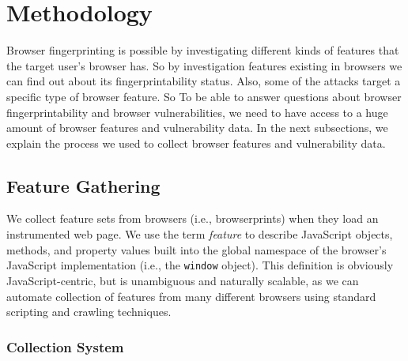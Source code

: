 \section{Methodology}
\label{sec:methodology}
Browser fingerprinting is possible by investigating different kinds of features that the target user's browser has. So by investigation features existing in browsers we can find out about its fingerprintability status.  Also, some of the attacks target a specific type of browser feature. So To be able to answer questions about browser fingerprintability and browser vulnerabilities, we need to have access to a huge amount of browser features and vulnerability data. In the next subsections, we explain the process we used to collect browser features and vulnerability data.


\subsection{Feature Gathering}

We collect feature sets from browsers (i.e., browserprints) when they load an instrumented web page.
We use the term \textit{feature} to describe JavaScript objects, methods, and property values built into the global namespace of the browser's JavaScript implementation (i.e., the \texttt{window} object).
This definition is obviously JavaScript-centric, but is unambiguous and naturally scalable, as we can automate collection of features from many different browsers using standard scripting and crawling techniques.


\subsubsection{Collection System}

